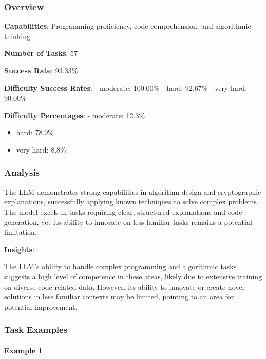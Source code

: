\documentclass[fleqn,10pt]{wlscirep}
\begin{document}
\hypertarget{overview-13}{%
\subsubsection{Overview}\label{overview-13}}

\textbf{Capabilities}: Programming proficiency, code comprehension, and
algorithmic thinking

\textbf{Number of Tasks}: 57

\textbf{Success Rate}: 93.33\%

\textbf{Difficulty Success Rates}: - moderate: 100.00\% - hard: 92.67\%
- very hard: 90.00\%

\textbf{Difficulty Percentages}: - moderate: 12.3\%

\begin{itemize}
\item
  hard: 78.9\%
\item
  very hard: 8.8\%
\end{itemize}

\hypertarget{analysis-12}{%
\subsubsection{Analysis}\label{analysis-12}}

The LLM demonstrates strong capabilities in algorithm design and
cryptographic explanations, successfully applying known techniques to
solve complex problems. The model excels in tasks requiring clear,
structured explanations and code generation, yet its ability to innovate
on less familiar tasks remains a potential limitation.

\textbf{Insights}:

The LLM's ability to handle complex programming and algorithmic tasks
suggests a high level of competence in these areas, likely due to
extensive training on diverse code-related data. However, its ability to
innovate or create novel solutions in less familiar contexts may be
limited, pointing to an area for potential improvement.

\hypertarget{task-examples-12}{%
\subsubsection{Task Examples}\label{task-examples-12}}

\hypertarget{example-1-12}{%
\paragraph{Example 1}\label{example-1-12}}
\end{document}
